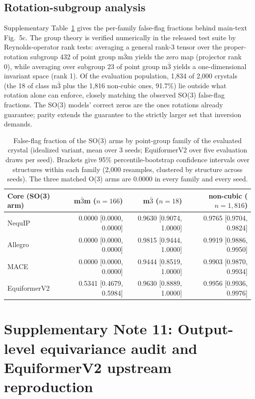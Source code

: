 \subsection*{Rotation-subgroup analysis}

Supplementary Table~\ref{stab:e7} gives the per-family false-flag fractions behind main-text Fig.~5c. The group theory is verified numerically in the released test suite by Reynolds-operator rank tests: averaging a general rank-3 tensor over the proper-rotation subgroup 432 of point group m$\bar 3$m yields the zero map (projector rank 0), while averaging over subgroup 23 of point group m$\bar 3$ yields a one-dimensional invariant space (rank 1). Of the evaluation population, 1,834 of 2,000 crystals (the 18 of class m$\bar 3$ plus the 1,816 non-cubic ones, 91.7\%) lie outside what rotation alone can enforce, closely matching the observed SO(3) false-flag fractions. The SO(3) models' correct zeros are the ones rotations already guarantee; parity extends the guarantee to the strictly larger set that inversion demands.

\begin{table}[htbp]
\centering
\caption{False-flag fraction of the SO(3) arms by point-group family of the evaluated crystal (idealized variant, mean over 3 seeds; EquiformerV2 over five evaluation draws per seed). Brackets give 95\% percentile-bootstrap confidence intervals over structures within each family (2,000 resamples, clustered by structure across seeds). The three matched O(3) arms are 0.0000 in every family and every seed.}
\label{stab:e7}
\scriptsize
\begin{tabular}{lrrr}
\toprule
Core (SO(3) arm) & m$\bar 3$m ($n{=}166$) & m$\bar 3$ ($n{=}18$) & non-cubic ($n{=}1{,}816$) \\
\midrule
NequIP & 0.0000 [0.0000, 0.0000] & 0.9630 [0.9074, 1.0000] & 0.9765 [0.9704, 0.9824] \\
Allegro & 0.0000 [0.0000, 0.0000] & 0.9815 [0.9444, 1.0000] & 0.9919 [0.9886, 0.9950] \\
MACE & 0.0000 [0.0000, 0.0000] & 0.9444 [0.8519, 1.0000] & 0.9903 [0.9870, 0.9934] \\
EquiformerV2 & 0.5341 [0.4679, 0.5984] & 0.9630 [0.8889, 1.0000] & 0.9956 [0.9936, 0.9976] \\
\bottomrule
\end{tabular}
\end{table}

\section*{Supplementary Note 11: Output-level equivariance audit and EquiformerV2 upstream reproduction}

